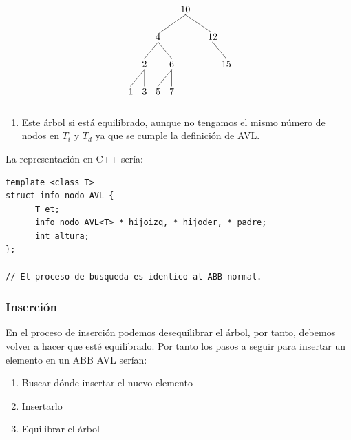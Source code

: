 \documentclass[10pt,a4paper,spanish]{report}
\begin{document}
\begin{minipage}{0.6\textwidth}
\[\begin{xy}
,(0,0)*+=<10mm>[]\txt<2cm>{10}
,(-10,-10)*+=<10mm>[]\txt<2cm>{4}
,(10,-10)*+=<10mm>[]\txt<2cm>{12}
,(-15,-20)*+=<10mm>[]\txt<2cm>{2}
,(-5,-20)*+=<10mm>[]\txt<2cm>{6}
,(15,-20)*+=<10mm>[]\txt<2cm>{15}
,(-20,-30)*+=<10mm>[]\txt<2cm>{1}
,(-15,-30)*+=<10mm>[]\txt<2cm>{3}
,(-10,-30)*+=<10mm>[]\txt<2cm>{5}
,(-5,-30)*+=<10mm>[]\txt<2cm>{7}

\ar@{-} (0,-2);(-10,-9) %
\ar@{-} (0,-2);(9,-8) %
\ar@{-} (-10,-12);(-15,-18) %
\ar@{-} (10,-12);(15,-18) %
\ar@{-} (-15,-22);(-20,-28)
\ar@{-} (-15,-22);(-15,-28)
\ar@{-} (-10,-12);(-5,-18) %
\ar@{-} (-5,-22);(-10,-28) %
\ar@{-} (-5,-22);(-5,-28) %
\end{xy}\]
\end{minipage}
\begin{minipage}{0.6\textwidth}
\begin{enumerate}[$\bigstar$]
      \item Este árbol si está equilibrado, aunque no tengamos el mismo número de nodos en $T_i$ y $T_d$ ya que se cumple la definición de AVL.
\end{enumerate}
\end{minipage}

\noindent
La representación en C++ sería:
\begin{verbatim}
template <class T>
struct info_nodo_AVL {
      T et;
      info_nodo_AVL<T> * hijoizq, * hijoder, * padre;
      int altura;
};

// El proceso de busqueda es identico al ABB normal.
\end{verbatim}

\subsubsection{\textcolor[rgb]{0.3,0.4,0.8}Inserción}
\noindent
En el proceso de inserción podemos desequilibrar el árbol, por tanto, debemos volver a hacer que esté equilibrado. Por tanto los pasos a seguir para insertar un elemento en un ABB AVL serían:
\begin{enumerate}
      \item Buscar dónde insertar el nuevo elemento
      \item Insertarlo
      \item Equilibrar el árbol
\end{enumerate}
\end{document}
